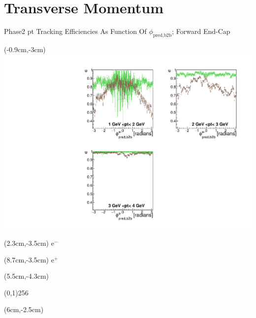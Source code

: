 \documentclass[8pt]{beamer}
\begin{document}
\section{Transverse Momentum}






\begin{frame}{Phase2 pt Tracking Efficiencies As Function Of $\phi_{\textrm{pred,b2b}}$; Forward End-Cap}
	
	
	\begin{textblock*}{6.5cm}(-0.9cm,-3cm)
		\includegraphics[width=\textwidth]{VPlots/P2/xPtMPhiemFC}
	\end{textblock*}
	
	\begin{textblock*}{2cm}(2.3cm,-3.5cm)
		$\textrm{e}^-$
	\end{textblock*}
	
	\begin{textblock*}{2cm}(8.7cm,-3.5cm)
		$\textrm{e}^+$
	\end{textblock*}
	
	
	\begin{textblock*}{11cm}(5.5cm,-4.3cm)
		
		\begin{center}
			\line(0,1){256}
		\end{center}
		
	\end{textblock*}
	
	
	\begin{textblock*}{6.5cm}(6cm,-2.5cm)
		

\end{textblock*}
\end{frame}
\end{document}
